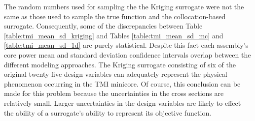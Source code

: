 The random numbers used for sampling the the Kriging surrogate were not the same as those used to sample the true function and the collocation-based surrogate. Consequently, some of the discrepancies between Table \ref{table:tmi_mean_sd_kriging} and Tables \ref{table:tmi_mean_sd_mc} and \ref{table:tmi_mean_sd_1d} are purely statistical. Despite this fact each assembly's core power mean and standard deviation confidence intervals overlap between the different modeling approaches. The Kriging surrogate consisting of six of the original twenty five design variables can adequately represent the physical phenomenon occurring in the \ac{TMI} minicore. Of course, this conclusion can be made for this problem because the uncertainties in the cross sections are relatively small. Larger uncertainties in the design variables are likely to effect the ability of a surrogate's ability to represent its objective function.            
